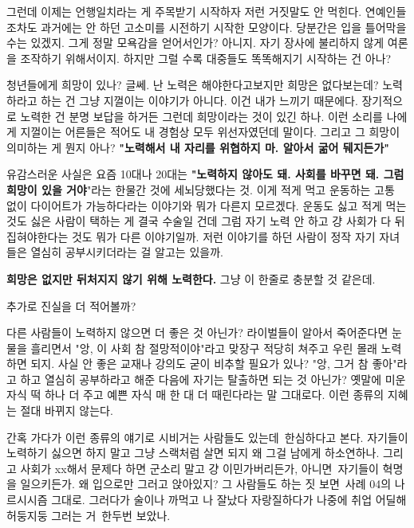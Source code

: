 그런데 이제는 언행일치라는 게 주목받기 시작하자 저런 거짓말도 안 먹힌다.
연예인들조차도 과거에는 안 하던 고소미를 시전하기 시작한 모양이다. 당분간은 입을 틀어막을 수는 있겠지.
그게 정말 모욕감을 얻어서인가? 아니지. 자기 장사에 불리하지 않게 여론을 조작하기 위해서이지.
하지만 그럴 수록 대중들도 똑똑해지기 시작하는 건 아나?
\vspace{5mm}

청년들에게 희망이 있나? 글쎄. 난 노력은 해야한다고보지만 희망은 없다보는데?
노력하라고 하는 건 그냥 지껄이는 이야기가 아니다. 이건 내가 느끼기 때문에다. 장기적으로 노력한 건 분명 보답을 하거든
그런데 희망이라는 것이 있긴 하나. 이런 소리를 나에게 지껄이는 어른들은 적어도 내 경험상 모두 위선자였던데 말이다.
그리고 그 희망이 의미하는 게 뭔지 아나? \textbf{"노력해서 내 자리를 위협하지 마. 알아서 굶어 뒈지든가"}
\vspace{5mm}

유감스러운 사실은 요즘 10대나 20대는
\textbf{"노력하지 않아도 돼. 사회를 바꾸면 돼. 그럼 희망이 있을 거야}"라는 한물간 것에 세뇌당했다는 것.
이게 적게 먹고 운동하는 고통 없이 다이어트가 가능하다라는 이야기와 뭐가 다른지 모르겠다.
운동도 싫고 적게 먹는 것도 싫은 사람이 택하는 게 결국 수술일 건데
그럼 자기 노력 안 하고 걍 사회가 다 뒤집혀야한다는 것도 뭐가 다른 이야기일까.
저런 이야기를 하던 사람이 정작 자기 자녀들은 열심히 공부시키더라는 걸 알고는 있을까.
\vspace{5mm}

\textbf{희망은 없지만 뒤처지지 않기 위해 노력한다.}
그냥 이 한줄로 충분할 것 같은데.
\vspace{5mm}

추가로 진실을 더 적어볼까?
\vspace{5mm}

다른 사람들이 노력하지 않으면 더 좋은 것 아닌가?
라이벌들이 알아서 죽어준다면 눈물을 흘리면서 "앙, 이 사회 참 절망적이야"라고 맞장구 적당히 쳐주고 우린 몰래 노력하면 되지.
사실 안 좋은 교재나 강의도 굳이 비추할 필요가 있나?
"앙, 그거 참 좋아"라고 하고 열심히 공부하라고 해준 다음에 자기는 탈출하면 되는 것 아닌가?
옛말에 미운 자식 떡 하나 더 주고 예쁜 자식 매 한 대 더 때린다라는 말 그대로다. 이런 종류의 지혜는 절대 바뀌지 않는다.
\vspace{5mm}

간혹 가다가 이런 종류의 얘기로 시비거는 사람들도 있는데 한심하다고 본다.
자기들이 노력하기 싫으면 하지 말고 그냥 스랙처럼 살면 되지 왜 그걸 남에게 하소연하나.
그리고 사회가 xx해서 문제다 하면 군소리 말고 걍 이민가버리든가, 아니면 자기들이 혁명을 일으키든가.
왜 입으로만 그러고 앉아있지?
그 사람들도 하는 짓 보면 사례 04의 나르시시즘 그대로.
그러다가 술이나 까먹고 나 잘났다 자랑질하다가 나중에 취업 어딜해 허둥지둥 그러는 거 한두번 보았나.
\vspace{5mm}

